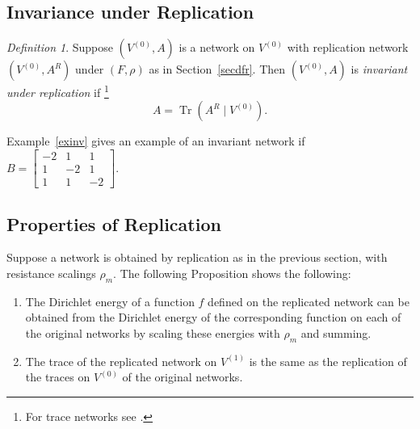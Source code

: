 \documentclass[a4paper]{amsart}
\theoremstyle{plain}
\theoremstyle{definition}
\theoremstyle{remark}
\newtheorem{defn}[theorem]{Definition}
\DeclareMathOperator{\Tr}{Tr}
\begin{document}
  
\subsection{Invariance under Replication} 
 \begin{defn} Suppose $ (V^{(0)}, A)$  is a network on $  V^{(0)} $ with replication network $ (V^{(0)}, A^R)$ under $ (F,\rho) $ as in Section~\ref{secdfr}.  Then   $ (V^{(0)}, A)$ is \emph{invariant under replication} if%
\footnote{For trace networks see \cite{Hut}.}  
\[
A = \Tr (A^R \mid V^{(0)} ).
\] 
\end{defn}  

Example~\ref{exinv} gives an example of an invariant network if $ B = \begin{bmatrix} -2 & 1 & 1 \\ 1 & -2 & 1 \\ 1 & 1  & -2 \end{bmatrix} $.




\subsection{Properties of Replication}  

Suppose a network is obtained by replication as in the previous section, with resistance scalings $ \rho_m $. The following Proposition shows the following:
\begin{enumerate}
\item  The  Dirichlet energy of a function $ f $ defined on the replicated   network can be  obtained from the  Dirichlet energy of the    corresponding function  on each of the original networks by  scaling   these energies with $ \rho_m $  and summing.


\item The trace of the replicated network on $ V^{(1)} $ is the same as the replication of the traces   on $ V^{(0)}$ of the original networks.
\end{enumerate} 
\end{document}

